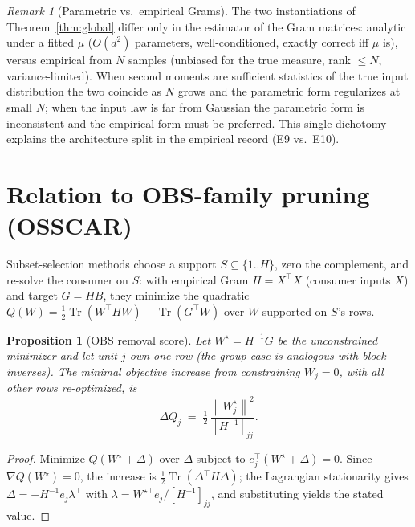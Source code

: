 \documentclass[11pt]{article}
\newtheorem{proposition}[theorem]{Proposition}
\theoremstyle{remark}
\newtheorem{remark}[theorem]{Remark}
\newcommand{\norm}[1]{\left\lVert #1 \right\rVert}
\DeclareMathOperator{\Tr}{Tr}
\begin{document}
\begin{remark}[Parametric vs.\ empirical Grams]\label{rem:estimators}
The two instantiations of Theorem~\ref{thm:global} differ only in the
estimator of the Gram matrices: analytic under a fitted $\mu$
($O(d^2)$ parameters, well-conditioned, exactly correct iff $\mu$ is), versus
empirical from $N$ samples (unbiased for the true measure, rank $\le N$,
variance-limited). When second moments are sufficient statistics of the true
input distribution the two coincide as $N$ grows and the parametric form
regularizes at small $N$; when the input law is far from Gaussian the
parametric form is inconsistent and the empirical form must be preferred.
This single dichotomy explains the architecture split in the empirical
record (E9 vs.\ E10).
\end{remark}

\section{Relation to OBS-family pruning (OSSCAR)}\label{sec:osscar}

Subset-selection methods choose a support $S \subseteq \{1..H\}$, zero the
complement, and re-solve the consumer on $S$: with empirical Gram
$H = X^\top X$ (consumer inputs $X$) and target $G = HB$, they minimize the
quadratic $Q(W) = \tfrac12 \Tr(W^\top H W) - \Tr(G^\top W)$ over $W$
supported on $S$'s rows.

\begin{proposition}[OBS removal score]\label{prop:obs}
Let $W^\star = H^{-1}G$ be the unconstrained minimizer and let unit $j$ own
one row (the group case is analogous with block inverses). The minimal
objective increase from constraining $W_j = 0$, with all other rows
re-optimized, is
\[
  \Delta Q_j \;=\; \tfrac12\, \frac{\norm{W^\star_j}^2}{[H^{-1}]_{jj}} .
\]
\end{proposition}

\begin{proof}
Minimize $Q(W^\star + \Delta)$ over $\Delta$ subject to
$e_j^\top(W^\star+\Delta) = 0$. Since $\nabla Q(W^\star)=0$, the increase is
$\tfrac12\Tr(\Delta^\top H \Delta)$; the Lagrangian stationarity gives
$\Delta = -H^{-1}e_j \lambda^\top$ with
$\lambda = W^{\star\top} e_j / [H^{-1}]_{jj}$, and substituting yields the
stated value.
\end{proof}
\end{document}
